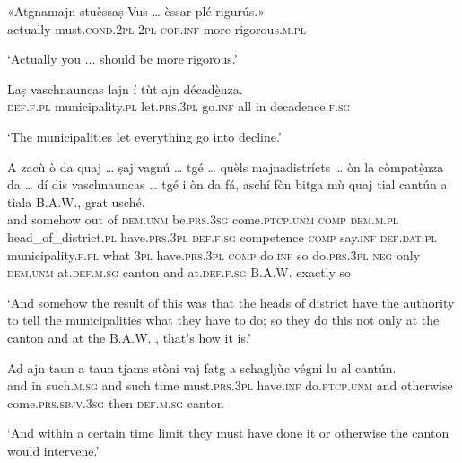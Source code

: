 \begin{linenumbers}
\gll «Atgnamajn stuèssaṣ Vus … èssar plé rigurús.»   \\
actually must.\textsc{cond.2pl} \textsc{2pl} {} \textsc{cop.inf} more rigorous.\textsc{m.pl}\\
\end{linenumbers}
\medskip
\glt `Actually you ... should be more rigorous.'
\medskip

\begin{linenumbers}
\gll Laṣ vaschnauncas lajn í tùt ajn décadè̱nza.   \\
 \textsc{def.f.pl} municipality.\textsc{pl} let.\textsc{prs.3pl} go.\textsc{inf} all in decadence.\textsc{f.sg}  \\
\end{linenumbers}
\medskip
\glt `The municipalities let everything go into decline.'
\medskip

\begin{linenumbers}
\gll A zacù ò da quaj … ṣaj vagnú … tgé … quèls majnadistrícts … òn la còmpatè̱nza da … dí dis vaschnauncas … tgé i òn da fá, aschí fòn bitga mù quaj tial cantún a tiala B.A.W.\footnotemark, grat usché.\\
and somehow out of \textsc{dem.unm} {} be.\textsc{prs.3sg} come.\textsc{ptcp.unm} {} \textsc{comp} {} \textsc{dem.m.pl} head\_of\_district.\textsc{pl} {} have.\textsc{prs.3pl} \textsc{def.f.sg} competence \textsc{comp} {} say.\textsc{inf}  \textsc{def.dat.pl} municipality.\textsc{f.pl} {} what \textsc{3pl} have.\textsc{prs.3pl} \textsc{comp} do.\textsc{inf} so do.\textsc{prs.3pl} \textsc{neg} only  \textsc{dem.unm} at.\textsc{def.m.sg} canton and at.\textsc{def.f.sg} B.A.W. exactly so \\
\end{linenumbers}
\medskip
\glt `And somehow the result of this was that the heads of district have the authority to tell the municipalities what they have to do; so they do this not only at the canton and at the B.A.W. , that's how it is.'
\medskip

\begin{linenumbers}
\gll Ad ajn taun a taun tjams stòni vaj fatg a schagljùc végni lu al cantún.\\
and in such.\textsc{m.sg} and such time must.\textsc{prs.3pl} have.\textsc{inf} do.\textsc{ptcp.unm} and otherwise come.\textsc{prs.sbjv.3sg} then \textsc{def.m.sg} canton\\
\end{linenumbers}
\medskip
\glt `And within a certain time limit they must have done it or otherwise the canton would intervene.'
\medskip

